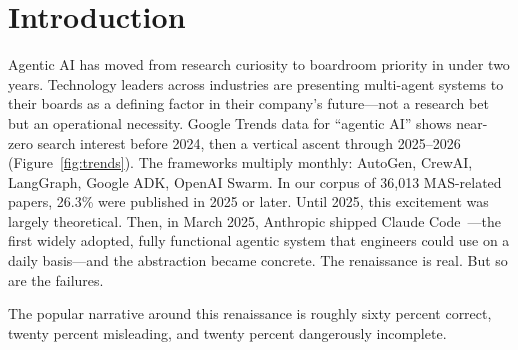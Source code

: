 \documentclass{article}
\begin{document}
\section{Introduction}
\label{sec:intro}

Agentic AI has moved from research curiosity to boardroom priority in under two years.
Technology leaders across industries are presenting multi-agent systems to their boards as
a defining factor in their company's future---not a research bet but an operational
necessity.  Google Trends data for ``agentic AI'' shows near-zero search interest before
2024, then a vertical ascent through 2025--2026 (Figure~\ref{fig:trends}).  The frameworks
multiply monthly: AutoGen, CrewAI, LangGraph, Google ADK, OpenAI Swarm.  In our corpus of
36,013 MAS-related papers, 26.3\% were published in 2025 or later.  Until 2025, this
excitement was largely theoretical.  Then, in March 2025, Anthropic shipped Claude
Code~\citep{anthropic2025claudecode}---the first widely adopted, fully functional agentic
system that engineers could use on a daily basis---and the abstraction became concrete.
The renaissance is real.  But so are the failures.



The popular narrative around this renaissance is roughly sixty percent correct, twenty
percent misleading, and twenty percent dangerously incomplete.
\end{document}
